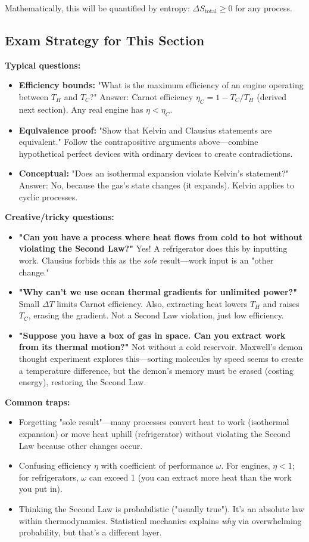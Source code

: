 \documentclass[9pt,twocoloumn]{article}
\begin{document}
Mathematically, this will be quantified by entropy: $\Delta S_{\text{total}} \geq 0$ for any process.

\subsection{Exam Strategy for This Section}

\textbf{Typical questions:}
\begin{itemize}
    \item \textbf{Efficiency bounds:} "What is the maximum efficiency of an engine operating between $T_H$ and $T_C$?" Answer: Carnot efficiency $\eta_C = 1 - T_C/T_H$ (derived next section). Any real engine has $\eta < \eta_C$.
    \item \textbf{Equivalence proof:} "Show that Kelvin and Clausius statements are equivalent." Follow the contrapositive arguments above—combine hypothetical perfect devices with ordinary devices to create contradictions.
    \item \textbf{Conceptual:} "Does an isothermal expansion violate Kelvin's statement?" Answer: No, because the gas's state changes (it expands). Kelvin applies to cyclic processes.
\end{itemize}

\textbf{Creative/tricky questions:}
\begin{itemize}
    \item \textbf{"Can you have a process where heat flows from cold to hot without violating the Second Law?"} Yes! A refrigerator does this by inputting work. Clausius forbids this as the \emph{sole} result—work input is an "other change."
    \item \textbf{"Why can't we use ocean thermal gradients for unlimited power?"} Small $\Delta T$ limits Carnot efficiency. Also, extracting heat lowers $T_H$ and raises $T_C$, erasing the gradient. Not a Second Law violation, just low efficiency.
    \item \textbf{"Suppose you have a box of gas in space. Can you extract work from its thermal motion?"} Not without a cold reservoir. Maxwell's demon thought experiment explores this—sorting molecules by speed seems to create a temperature difference, but the demon's memory must be erased (costing energy), restoring the Second Law.
\end{itemize}

\textbf{Common traps:}
\begin{itemize}
    \item Forgetting "sole result"—many processes convert heat to work (isothermal expansion) or move heat uphill (refrigerator) without violating the Second Law because other changes occur.
    \item Confusing efficiency $\eta$ with coefficient of performance $\omega$. For engines, $\eta < 1$; for refrigerators, $\omega$ can exceed 1 (you can extract more heat than the work you put in).
    \item Thinking the Second Law is probabilistic ("usually true"). It's an absolute law within thermodynamics. Statistical mechanics explains \emph{why} via overwhelming probability, but that's a different layer.
\end{itemize}
\end{document}
